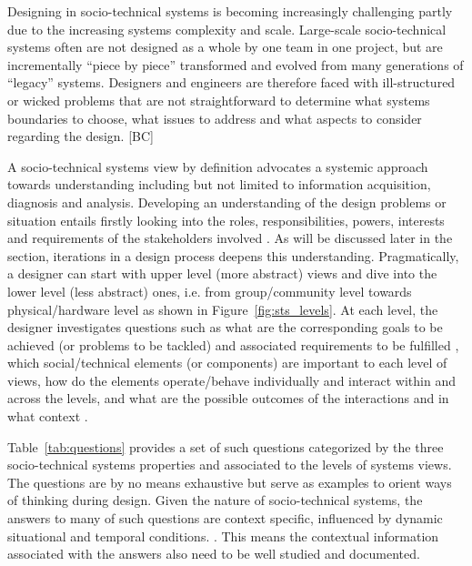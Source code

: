 Designing in socio-technical systems is becoming increasingly challenging partly due to the increasing systems complexity and scale.  
Large-scale socio-technical systems often are not designed as a whole by one team in one project, but are incrementally ``piece by piece'' transformed and evolved from many generations of ``legacy'' systems. Designers and engineers are therefore faced with ill-structured or wicked problems that are not straightforward to determine what systems boundaries to choose, what issues to address and what aspects to consider regarding the design. [BC]

A socio-technical systems view by definition advocates a systemic approach towards understanding including but not limited to information acquisition, diagnosis and analysis. Developing an understanding of the design problems or situation entails firstly looking into the roles, responsibilities, powers, interests and requirements of the stakeholders involved \cite{Checkland1981}. As will be discussed later in the section, iterations in a design process deepens this understanding. 
Pragmatically, a designer can start with upper level (more abstract) views and dive into the lower level (less abstract) ones, i.e. from group/community level towards physical/hardware level as shown in Figure~\ref{fig:sts_levels}.
At each level, the designer investigates questions such as what are the corresponding goals to be achieved (or problems to be tackled) \cite{Checkland1981,Waterson2002} and associated requirements to be fulfilled \cite{Whitworth2009a}, which social/technical elements (or components) are important to each level of views, how do the elements operate/behave individually and interact within and across the levels, and what are the possible outcomes of the interactions and in what context \cite{Baxter2011}. 

Table~\ref{tab:questions} provides a set of such questions categorized by the three socio-technical systems properties and associated to the levels of systems views. The questions are by no means exhaustive but serve as examples to orient ways of thinking during design. 
Given the nature of socio-technical systems, the answers to many of such questions are context specific, influenced by dynamic situational and temporal conditions. \cite{Baxter2011,Norman2015}. This means the contextual information associated with the answers also need to be well studied and documented. 

